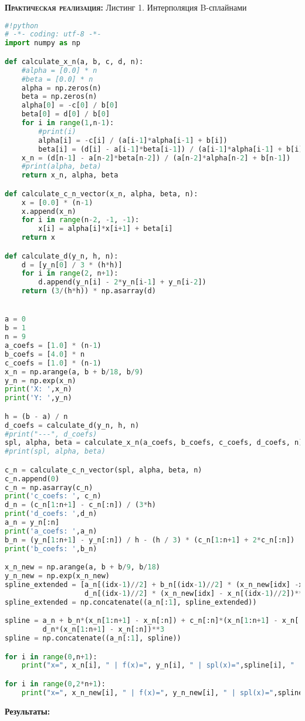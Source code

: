 \documentclass [12pt]{article}
\begin{document}
\textsc{\textbf{Практическая реализация:}}
Листинг 1. Интерполяция B-сплайнами
\begin{lstlisting}[language=python]
#!python
# -*- coding: utf-8 -*-
import numpy as np

def calculate_x_n(a, b, c, d, n):
    #alpha = [0.0] * n
    #beta = [0.0] * n
    alpha = np.zeros(n)
    beta = np.zeros(n)    
    alpha[0] = -c[0] / b[0]
    beta[0] = d[0] / b[0]
    for i in range(1,n-1):
        #print(i)
        alpha[i] = -c[i] / (a[i-1]*alpha[i-1] + b[i])
        beta[i] = (d[i] - a[i-1]*beta[i-1]) / (a[i-1]*alpha[i-1] + b[i])
    x_n = (d[n-1] - a[n-2]*beta[n-2]) / (a[n-2]*alpha[n-2] + b[n-1])
    #print(alpha, beta)
    return x_n, alpha, beta

def calculate_c_n_vector(x_n, alpha, beta, n):
    x = [0.0] * (n-1)
    x.append(x_n)
    for i in range(n-2, -1, -1):
        x[i] = alpha[i]*x[i+1] + beta[i]
    return x

def calculate_d(y_n, h, n):
    d = [y_n[0] / 3 * (h*h)]
    for i in range(2, n+1):
        d.append(y_n[i] - 2*y_n[i-1] + y_n[i-2])
    return (3/(h*h)) * np.asarray(d)


a = 0
b = 1
n = 9
a_coefs = [1.0] * (n-1)
b_coefs = [4.0] * n
c_coefs = [1.0] * (n-1)
x_n = np.arange(a, b + b/18, b/9)
y_n = np.exp(x_n)
print('X: ',x_n)
print('Y: ',y_n)

h = (b - a) / n
d_coefs = calculate_d(y_n, h, n)
#print("---", d_coefs)
spl, alpha, beta = calculate_x_n(a_coefs, b_coefs, c_coefs, d_coefs, n)
#print(spl, alpha, beta)

c_n = calculate_c_n_vector(spl, alpha, beta, n)
c_n.append(0)
c_n = np.asarray(c_n)
print('c_coefs: ', c_n)
d_n = (c_n[1:n+1] - c_n[:n]) / (3*h)
print('d_coefs: ',d_n)
a_n = y_n[:n]
print('a_coefs: ',a_n)
b_n = (y_n[1:n+1] - y_n[:n]) / h - (h / 3) * (c_n[1:n+1] + 2*c_n[:n])
print('b_coefs: ',b_n)

x_n_new = np.arange(a, b + b/9, b/18)
y_n_new = np.exp(x_n_new)
spline_extended = [a_n[(idx-1)//2] + b_n[(idx-1)//2] * (x_n_new[idx] -x_n[(idx-1)//2]) + c_n[(idx-1)//2] * (x_n_new[idx] - x_n[(idx-1)//2])**2 +\
                   d_n[(idx-1)//2] * (x_n_new[idx] - x_n[(idx-1)//2])**3 for idx in range(1, len(a_n)*2+1)]
spline_extended = np.concatenate((a_n[:1], spline_extended))

spline = a_n + b_n*(x_n[1:n+1] - x_n[:n]) + c_n[:n]*(x_n[1:n+1] - x_n[:n])**2 +\
         d_n*(x_n[1:n+1] - x_n[:n])**3
spline = np.concatenate((a_n[:1], spline))

for i in range(0,n+1):
    print("x=", x_n[i], " | f(x)=", y_n[i], " | spl(x)=",spline[i], " | delta=", np.abs(y_n[i]-spline[i]))

for i in range(0,2*n+1):
    print("x=", x_n_new[i], " | f(x)=", y_n_new[i], " | spl(x)=",spline_extended[i], " | delta=", np.abs(y_n_new[i]-spline_extended[i]))


\end{lstlisting}
\textbf{Результаты:}
\end{document}

